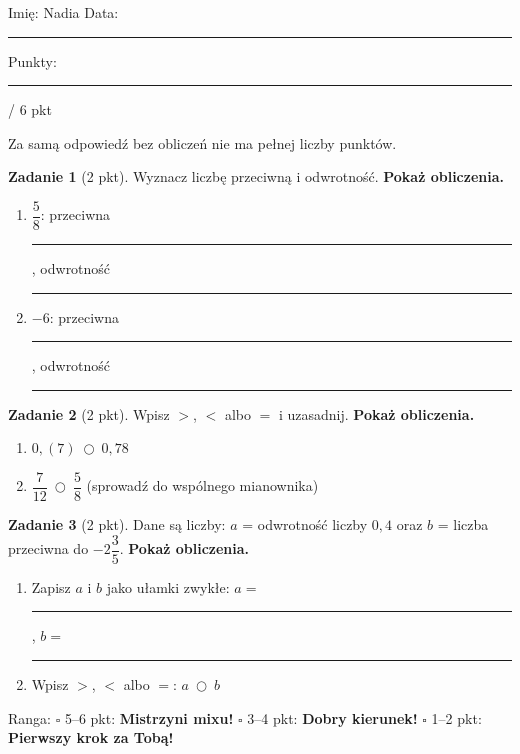 \documentclass[11pt,a4paper]{article}
\begin{document}

\vspace{0.2em}
Imię: Nadia \hfill Data: \rule{3cm}{0.4pt} \hfill Punkty: \rule{1.2cm}{0.4pt} / 6 pkt

\vspace{0.2em}
{\small Za samą odpowiedź bez obliczeń nie ma pełnej liczby punktów.}

\vspace{0.4em}
\textbf{Zadanie 1} (2 pkt). Wyznacz liczbę przeciwną i odwrotność. \textbf{Pokaż obliczenia.}
\begin{enumerate}[label=\alph*), leftmargin=*, itemsep=6pt]
  \item $\dfrac{5}{8}$: przeciwna \rule{2.5cm}{0.4pt}, odwrotność \rule{2.5cm}{0.4pt}
  \item $-6$: przeciwna \rule{2.5cm}{0.4pt}, odwrotność \rule{2.5cm}{0.4pt}
\end{enumerate}
\miejsce{3.4cm}

\textbf{Zadanie 2} (2 pkt). Wpisz $>$, $<$ albo $=$ i uzasadnij. \textbf{Pokaż obliczenia.}
\begin{enumerate}[label=\alph*), leftmargin=*, itemsep=6pt]
  \item $0{,}(7)\ \bigcirc\ 0{,}78$
  \item $\dfrac{7}{12}\ \bigcirc\ \dfrac{5}{8}$ \hspace{0.8cm} (sprowadź do wspólnego mianownika)
\end{enumerate}
\miejsce{4cm}

\textbf{Zadanie 3} (2 pkt). Dane są liczby: $a$ = odwrotność liczby $0{,}4$ oraz $b$ = liczba przeciwna do $-2\dfrac{3}{5}$. \textbf{Pokaż obliczenia.}
\begin{enumerate}[label=\alph*), leftmargin=*, itemsep=6pt]
  \item Zapisz $a$ i $b$ jako ułamki zwykłe: $a=$ \rule{2.5cm}{0.4pt}, $b=$ \rule{2.5cm}{0.4pt}
  \item Wpisz $>$, $<$ albo $=$: $a\ \bigcirc\ b$
\end{enumerate}
\miejsce{4cm}

\begin{tcolorbox}[colback=white, colframe=cel, boxrule=0.6pt, arc=2pt]
Ranga: \quad $\square$ 5--6 pkt: \textbf{Mistrzyni mixu!} \quad $\square$ 3--4 pkt: \textbf{Dobry kierunek!} \quad $\square$ 1--2 pkt: \textbf{Pierwszy krok za Tobą!}
\end{tcolorbox}
\end{document}
